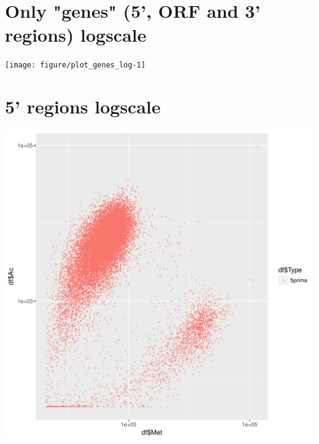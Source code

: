 \documentclass{article}\usepackage[]{graphicx}\usepackage[]{color}
\makeatletter
\def\maxwidth{ %
  \ifdim\Gin@nat@width>\linewidth
    \linewidth
  \else
    \Gin@nat@width
  \fi
}
\newenvironment{knitrout}{}{} %
\makeatother
\begin{document}
\section{Only "genes" (5', ORF and 3' regions) logscale}
\begin{knitrout}
\color{fgcolor}
\texttt{[image: figure/plot\_genes\_log-1]} 

\end{knitrout}
\clearpage
\section{5' regions logscale}
\begin{knitrout}
\color{fgcolor}
\includegraphics[width=\maxwidth]{figure/plot_5_log-1} 

\end{knitrout}
\clearpage
\end{document}
